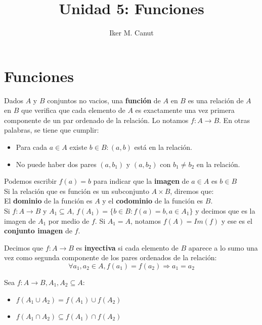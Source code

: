 \documentclass[11pt,a4paper]{article}
\author{Iker M. Canut}
\title{Unidad 5: Funciones}
\begin{document}
\maketitle
\newpage

\section{Funciones}
Dados $A$ y $B$ conjuntos no vacios, una \textbf{funci\'on} de $A$ en $B$ es una relaci\'on de $A$ en $B$ que verifica que cada elemento de $A$ es exactamente una vez primera componente de un par ordenado de la relaci\'on. Lo notamos $f : A \rightarrow B$. En otras palabras, se tiene que cumplir:
\begin{itemize}
\item Para cada $a \in A$ existe $b \in B : (a,b)$ est\'a en la relaci\'on.
\item No puede haber dos pares $(a, b_1)$ y $(a,b_2)$ con $b_1 \not = b_2$ en la relaci\'on.
\end{itemize}
Podemos escribir $f(a) = b$ para indicar que la \textbf{imagen} de $a\in A$ es $b\in B$\\

\noindent Si la relaci\'on que es funci\'on es un subconjunto $A\times B$, diremos que:\\
\indent El \textbf{dominio} de la funci\'on es $A$ y el \textbf{codominio} de la funci\'on es $B$.\\

Si $f : A \rightarrow B$ y $A_1 \subseteq A$,
$f(A_1) = \{ b \in B : f(a) = b, a \in A_1 \}$
y decimos que es la imagen de $A_1$ por medio de $f$. Si $A_1 = A$, notamos $f(A) = Im(f)$ y ese es el \textbf{conjunto imagen} de $f$.

\noindent \dotfill

Decimos que $f : A \rightarrow B$ es \textbf{inyectiva} si cada elemento de $B$ aparece a lo sumo una vez como segunda componente de los pares ordenados de la relaci\'on: $$\forall a_1, a_2 \in A, f(a_1) = f(a_2) \Rightarrow a_1 = a_2$$
\noindent \dotfill

Sea $f:A\rightarrow B, A_1, A_2 \subseteq A$:
\begin{multicols}{2}
\begin{itemize}
\item $f(A_1 \cup A_2) = f(A_1) \cup f(A_2)$
\item $f(A_1 \cap A_2) \subseteq f(A_1) \cap f(A_2)$
\end{itemize}
\end{multicols}
\noindent \dotfill
\end{document}
